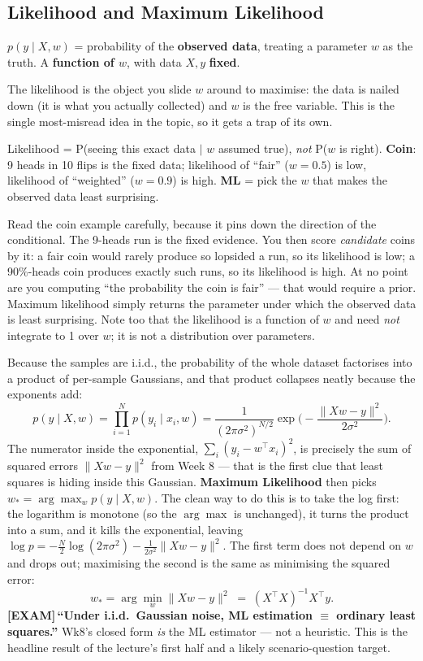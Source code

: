 \documentclass[11pt, a4paper]{article}
\newcommand{\examflag}{\textcolor{tipBd}{\textbf{[EXAM]}}\,}
\newcommand{\kw}[1]{\textbf{#1}}
\begin{document}
\subsection{Likelihood and Maximum Likelihood}

\begin{defbox}[likelihood]
$p(y\mid X,w)$ = probability of the \kw{observed data}, treating a parameter $w$ as the truth.
A \kw{function of $w$}, with data $X,y$ \kw{fixed}.
\end{defbox}

The likelihood is the object you slide $w$ around to maximise: the data is nailed down (it is what
you actually collected) and $w$ is the free variable. This is the single most-misread idea in the
topic, so it gets a trap of its own.

\begin{trapbox}
Likelihood = P(seeing this exact data $\mid$ $w$ assumed true), \emph{not} P($w$ is right).
\kw{Coin}: 9 heads in 10 flips is the fixed data; likelihood of ``fair'' ($w{=}0.5$) is low,
likelihood of ``weighted'' ($w{=}0.9$) is high. \kw{ML} = pick the $w$ that makes the observed data
least surprising.
\end{trapbox}

Read the coin example carefully, because it pins down the direction of the conditional. The 9-heads
run is the fixed evidence. You then score \emph{candidate} coins by it: a fair coin would rarely
produce so lopsided a run, so its likelihood is low; a 90\%-heads coin produces exactly such runs,
so its likelihood is high. At no point are you computing ``the probability the coin is fair'' —
that would require a prior. Maximum likelihood simply returns the parameter under which the observed
data is least surprising. Note too that the likelihood is a function of $w$ and need \emph{not}
integrate to 1 over $w$; it is not a distribution over parameters.

Because the samples are i.i.d., the probability of the whole dataset factorises into a product of
per-sample Gaussians, and that product collapses neatly because the exponents add:
\[
p(y\mid X,w)=\prod_{i=1}^N p(y_i\mid x_i,w)
=\frac{1}{(2\pi\sigma^2)^{N/2}}\exp\!\Big(-\frac{\|Xw-y\|^2}{2\sigma^2}\Big).
\]
The numerator inside the exponential, $\sum_i(y_i-w^\top x_i)^2$, is precisely the sum of squared
errors $\|Xw-y\|^2$ from Week 8 — that is the first clue that least squares is hiding inside this
Gaussian. \kw{Maximum Likelihood} then picks $w_\ast=\arg\max_w p(y\mid X,w)$. The clean way to do
this is to take the log first: the logarithm is monotone (so the $\arg\max$ is unchanged), it turns
the product into a sum, and it kills the exponential, leaving
$\log p=-\tfrac{N}{2}\log(2\pi\sigma^2)-\tfrac{1}{2\sigma^2}\|Xw-y\|^2$. The first term does not
depend on $w$ and drops out; maximising the second is the same as minimising the squared error:
\[
w_\ast=\arg\min_w\|Xw-y\|^2 \;=\;(X^\top X)^{-1}X^\top y.
\]
\examflag{}\kw{``Under i.i.d.\ Gaussian noise, ML estimation $\equiv$ ordinary least squares.''}
Wk8's closed form \emph{is} the ML estimator — not a heuristic. This is the headline result of the
lecture's first half and a likely scenario-question target.
\end{document}
